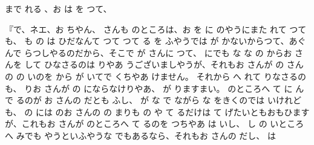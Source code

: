 まで
れる
、お
は
を
つて、

『で、ネエ、お
ちやん、
さんも
のところは、お
を
に
のやうにまた
れて
つても、
も
の
は
ひだなんて
つて
つて
る
を
ふやうでは
が
かないからつて、あぐんで
らつしやるのだから、そこで
が
さんに
つて、
にでも
な
な
の
からお
さんを
して
ひなさるのは
りやあ
うございましやうが、それもお
さんが
の
さんの
の
いのを
から
が
いてで
くちやあ
けません。
それから
へ
れて
りなさるのも、
りお
さんが
の
にならなけりやあ、
が
りますまい。
のところへ
て
に
んで
るのが
お
さんの
だとも
ふし、
が
な
で
ながら
な
をきくのでは
いけれども、
の
には
のお
さんの
の
まりも
の
や
て
るだけは
て
げたいともおもひますが、これもお
さんが
のところへ
て
るのを
つちやあ
は
いし、
し
の
いところへ
みでも
やうといふやうな
でもあるなら、それもお
さんの
だし、
は
